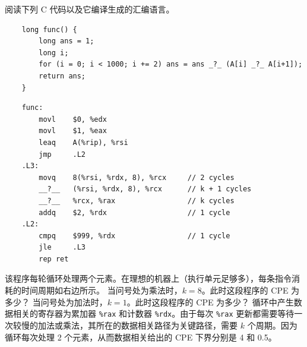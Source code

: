 \begin{problems}
        \pro 阅读下列 C 代码以及它编译生成的汇编语言。
        \begin{verbatim}
    long func() {
        long ans = 1;
        long i;
        for (i = 0; i < 1000; i += 2) ans = ans _?_ (A[i] _?_ A[i+1]);
        return ans;
    }
        \end{verbatim}
        \begin{verbatim}
    func:
        movl    $0, %edx
        movl    $1, %eax
        leaq    A(%rip), %rsi
        jmp     .L2
    .L3:
        movq    8(%rsi, %rdx, 8), %rcx     // 2 cycles
        __?__   (%rsi, %rdx, 8), %rcx      // k + 1 cycles
        __?__   %rcx, %rax                 // k cycles
        addq    $2, %rdx                   // 1 cycle
    .L2:
        cmpq    $999, %rdx                 // 1 cycle
        jle     .L3
        rep ret
        \end{verbatim}
        该程序每轮循环处理两个元素。在理想的机器上（执行单元足够多），每条指令消耗的时间周期如右边所示。
            \qn 当问号处为乘法时，$k=8$。此时这段程序的 CPE 为多少？
            \qn 当问号处为加法时，$k=1$。此时这段程序的 CPE 为多少？
        \sol 循环中产生数据相关的寄存器为累加器 \verb|%rax| 和计数器 \verb|%rdx|。由于每次 \verb|%rax| 更新都需要等待一次较慢的加法或乘法，其所在的数据相关路径为关键路径，需要 $k$ 个周期。因为循环每次处理 2 个元素，从而数据相关给出的 CPE 下界分别是 4 和 0.5。
    \end{problems}

